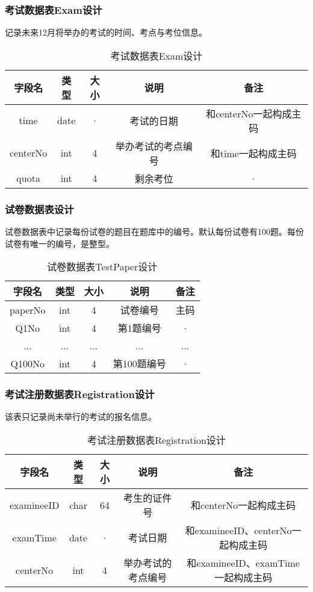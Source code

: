 \subsubsection{考试数据表Exam设计}
记录未来12月将举办的考试的时间、考点与考位信息。
\begin{table}[htbp]
\centering
\caption{考试数据表Exam设计} \label{tab:order-database}
\begin{tabular}{|c|c|c|c|c|}
    \hline
    字段名 & 类型 & 大小 & 说明 & 备注 \\
    \hline
    time & date & · & 考试的日期 & 和centerNo一起构成主码 \\
    \hline
    centerNo & int & 4 & 举办考试的考点编号 & 和time一起构成主码 \\
    \hline
    quota & int & 4 & 剩余考位 & · \\
    \hline
\end{tabular}
\end{table}

\subsubsection{试卷数据表设计}
试卷数据表中记录每份试卷的题目在题库中的编号。默认每份试卷有100题。每份试卷有唯一的编号，是整型。

\begin{table}[htbp]
\centering
\caption{试卷数据表TestPaper设计} \label{tab:order-database}
\begin{tabular}{|c|c|c|c|c|}
    \hline
    字段名 & 类型 & 大小 & 说明 & 备注 \\
    \hline
    paperNo & int & 4 & 试卷编号 & 主码 \\
    \hline
    Q1No & int & 4 & 第1题编号 & · \\
    \hline
    ... & ... & ... & ... & ... \\
    \hline
    Q100No & int & 4 & 第100题编号 & · \\
    \hline
\end{tabular}
\end{table}

\subsubsection{考试注册数据表Registration设计}
该表只记录尚未举行的考试的报名信息。
\begin{table}[htbp]
\centering
\caption{考试注册数据表Registration设计} \label{tab:order-database}
\begin{tabular}{|c|c|c|c|c|}
    \hline
    字段名 & 类型 & 大小 & 说明 & 备注 \\
    \hline
    examineeID & char & 64 & 考生的证件号 & 和centerNo一起构成主码 \\
    \hline
    examTime & date & · & 考试日期 & 和examineeID、centerNo一起构成主码 \\
    \hline
    centerNo & int & 4 & 举办考试的考点编号 & 和examineeID、examTime一起构成主码 \\
    \hline
\end{tabular}
\end{table}

